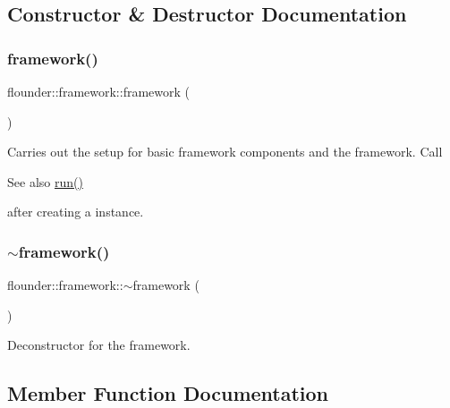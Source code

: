 \subsection{Constructor \& Destructor Documentation}
\mbox{\label{classflounder_1_1framework_ae7f076f63f78093952477e83174120f9}} 
\subsubsection{\texorpdfstring{framework()}{framework()}}
{\footnotesize\ttfamily flounder\+::framework\+::framework (\begin{DoxyParamCaption}{ }\end{DoxyParamCaption})}



Carries out the setup for basic framework components and the framework. Call \begin{DoxySeeAlso}{See also}
\hyperlink{classflounder_1_1framework_aa3a73c8e8f5f0c6ccef3e4de89982434}{run()}


\end{DoxySeeAlso}
after creating a instance. 

\mbox{\label{classflounder_1_1framework_a4f5440b66d1c2e7e35d9dc7fd733f944}} 
\subsubsection{\texorpdfstring{$\sim$framework()}{~framework()}}
{\footnotesize\ttfamily flounder\+::framework\+::$\sim$framework (\begin{DoxyParamCaption}{ }\end{DoxyParamCaption})}



Deconstructor for the framework. 



\subsection{Member Function Documentation}
\mbox{\label{classflounder_1_1framework_a1b1dbf1058cc4589b090326baf1beb87}} 
